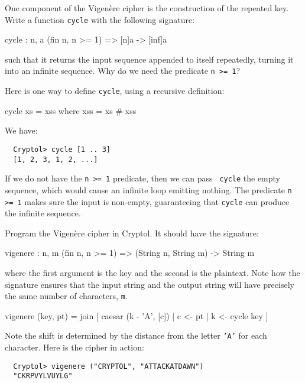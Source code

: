 \begin{Exercise}\label{ex:vigenere:0}
  One component of the Vigen\`{e}re cipher is the construction of the
  repeated key.  Write a function {\tt cycle} with the following
  signature:
\begin{code}
  cycle : {n, a} (fin n, n >= 1) => [n]a -> [inf]a
\end{code}
such that it returns the input sequence appended to itself repeatedly,
turning it into an infinite sequence. Why do we need the predicate
{\tt n >= 1}?\indPredicates
\end{Exercise}
\begin{Answer}
Here is one way to define {\tt cycle}, using a recursive definition:
\begin{code}
  cycle xs = xss
        where xss = xs # xss
\end{code}
We have:
\begin{Verbatim}
  Cryptol> cycle [1 .. 3]
  [1, 2, 3, 1, 2, ...]
\end{Verbatim}
If we do not have the {\tt n >= 1} predicate, then we can pass {\tt
  cycle} the empty sequence, which would cause an infinite loop
emitting nothing.  The predicate {\tt n >= 1} makes sure the input is
non-empty, guaranteeing that {\tt cycle} can produce the infinite
sequence.
\end{Answer}

\begin{Exercise}\label{ex:vigenere:1}
  Program the Vigen\`{e}re cipher in Cryptol. It should have the
  signature:
\begin{code}
  vigenere : {n, m} (fin n, n >= 1) => (String n, String m) -> String m
\end{code}
where the first argument is the key and the second is the
plaintext. Note how the signature ensures that the input string and
the output string will have precisely the same number of characters,
{\tt m}. 
\end{Exercise}
\begin{Answer}
\begin{code}
  vigenere (key, pt) = join [ caesar (k - 'A', [c]) 
                              | c <- pt
                              | k <- cycle key
                            ]
\end{code}
Note the shift is determined by the distance from the letter {\tt 'A'}
for each character. Here is the cipher in action:
\begin{Verbatim}
  Cryptol> vigenere ("CRYPTOL", "ATTACKATDAWN")
  "CKRPVYLVUYLG"
\end{Verbatim}
\end{Answer}

